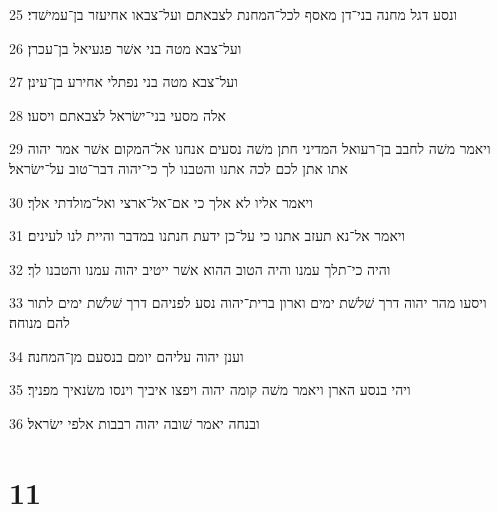 \par 25 ונסע דגל מחנה בני־דן מאסף לכל־המחנת לצבאתם ועל־צבאו אחיעזר בן־עמישׁדי׃
\par 26 ועל־צבא מטה בני אשׁר פגעיאל בן־עכרן׃
\par 27 ועל־צבא מטה בני נפתלי אחירע בן־עינן׃
\par 28 אלה מסעי בני־ישׂראל לצבאתם ויסעו׃
\par 29 ויאמר משׁה לחבב בן־רעואל המדיני חתן משׁה נסעים אנחנו אל־המקום אשׁר אמר יהוה אתו אתן לכם לכה אתנו והטבנו לך כי־יהוה דבר־טוב על־ישׂראל׃
\par 30 ויאמר אליו לא אלך כי אם־אל־ארצי ואל־מולדתי אלך׃
\par 31 ויאמר אל־נא תעזב אתנו כי על־כן ידעת חנתנו במדבר והיית לנו לעינים׃
\par 32 והיה כי־תלך עמנו והיה הטוב ההוא אשׁר ייטיב יהוה עמנו והטבנו לך׃
\par 33 ויסעו מהר יהוה דרך שׁלשׁת ימים וארון ברית־יהוה נסע לפניהם דרך שׁלשׁת ימים לתור להם מנוחה׃
\par 34 וענן יהוה עליהם יומם בנסעם מן־המחנה׃
\par 35 ויהי בנסע הארן ויאמר משׁה קומה יהוה ויפצו איביך וינסו משׂנאיך מפניך׃
\par 36 ובנחה יאמר שׁובה יהוה רבבות אלפי ישׂראל׃

\chapter{11}


